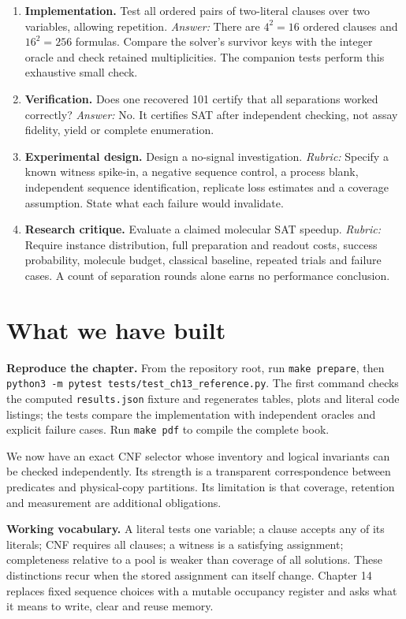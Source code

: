 \begin{enumerate}
Correlated or sequence-dependent losses need a different model.
\item \textbf{Implementation.} Test all ordered pairs of two-literal clauses
over two variables, allowing repetition. \textit{Answer:} There are
$4^2=16$ ordered clauses and $16^2=256$ formulas. Compare the solver's
survivor keys with the integer oracle and check retained multiplicities.
The companion tests perform this exhaustive small check.
\item \textbf{Verification.} Does one recovered 101 certify that all
separations worked correctly? \textit{Answer:} No. It certifies SAT after
independent checking, not assay fidelity, yield or complete enumeration.
\item \textbf{Experimental design.} Design a no-signal investigation.
\textit{Rubric:} Specify a known witness spike-in, a negative sequence control,
a process blank, independent sequence identification, replicate loss estimates
and a coverage assumption. State what each failure would invalidate.
\item \textbf{Research critique.} Evaluate a claimed molecular SAT speedup.
\textit{Rubric:} Require instance distribution, full preparation and readout
costs, success probability, molecule budget, classical baseline, repeated
trials and failure cases. A count of separation rounds alone earns no
performance conclusion.
\end{enumerate}

\section{What we have built}
\textbf{Reproduce the chapter.} From the repository root, run
\texttt{make prepare}, then
\texttt{python3 -m pytest tests/test\_ch13\_reference.py}.
The first command checks the computed \texttt{results.json} fixture and regenerates tables, plots and literal
code listings; the tests compare the implementation with independent
oracles and explicit failure cases. Run \texttt{make pdf} to compile the complete book.

We now have an exact CNF selector whose inventory and logical invariants
can be checked independently. Its strength is a transparent correspondence
between predicates and physical-copy partitions. Its limitation is that
coverage, retention and measurement are additional obligations.

\textbf{Working vocabulary.} A literal tests one variable; a clause accepts
any of its literals; CNF requires all clauses; a witness is a satisfying
assignment; completeness relative to a pool is weaker than coverage of
all solutions. These distinctions recur when the stored assignment can
itself change. Chapter 14 replaces fixed sequence choices with a mutable
occupancy register and asks what it means to write, clear and reuse memory.
